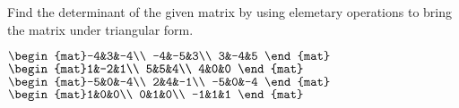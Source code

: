 
\begin{Exercise}[
name={},
title={}, 
difficulty=0,
origin={\cite{GH}}]
Find the determinant of the given matrix by using elemetary operations to bring the matrix
under triangular form.
\begin{multicols}{2}
\Question 
\Question $\begin{mat}-4&3&-4\\  -4&-5&3\\  3&-4&5 \end{mat}$
\Question $\begin{mat}1&-2&1\\  5&5&4\\  4&0&0 \end{mat}$
\Question $\begin{mat}-5&0&-4\\  2&4&-1\\  -5&0&-4 \end{mat}$
\Question $\begin{mat}1&0&0\\  0&1&0\\  -1&1&1 \end{mat}$

\end{multicols}
\end{Exercise}
